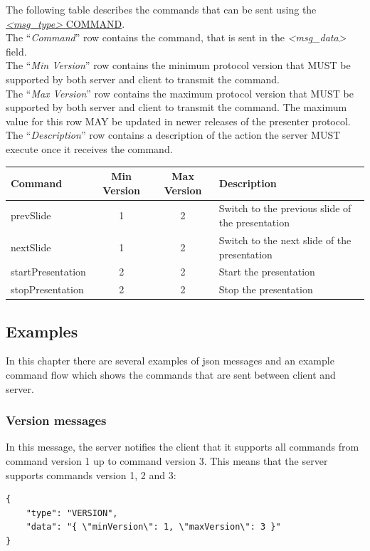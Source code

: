 \documentclass{article}
\begin{document}
The following table describes the commands that can be sent using the \hyperref[msg_command]{\emph{\textless{}msg\_type\textgreater{}} COMMAND}.\\
The ``\emph{Command}'' row contains the command, that is sent in the \emph{\textless{}msg\_data\textgreater{}} field.\\ The ``\emph{Min Version}'' row contains the minimum protocol version
that MUST be supported by both server and client to transmit the command.\\
The ``\emph{Max Version}'' row contains the maximum protocol version that MUST be supported by both server and client to transmit the command. The maximum value for this row MAY be updated in newer releases of the presenter protocol.\\
The ``\emph{Description}'' row contains a description of the action the server MUST execute once it receives the command.

\begin{longtable}{lccp{5cm}}
\toprule
Command & Min Version & Max Version & Description\\
\midrule
\endhead
prevSlide & 1 & 2 & Switch to the previous slide of the presentation\\
nextSlide & 1 & 2 & Switch to the next slide of the presentation\\
startPresentation & 2 & 2 & Start the presentation\\
stopPresentation & 2 & 2 & Stop the presentation\\
\bottomrule
\end{longtable}

\subsection{Examples}

In this chapter there are several examples of json messages and an example command flow which shows the commands that are sent between client and server.

\subsubsection{Version messages}

In this message, the server notifies the client that it supports all commands from command version 1 up to command version 3. This means that the server supports commands version 1, 2 and 3:

\begin{verbatim}
{
    "type": "VERSION",
    "data": "{ \"minVersion\": 1, \"maxVersion\": 3 }"
}
\end{verbatim}
\end{document}
